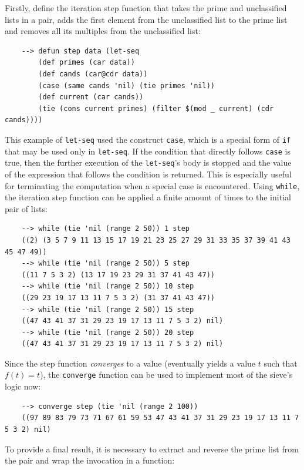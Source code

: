 Firstly, define the iteration step function that takes the prime and unclassified lists in a pair, adds the first element from the unclassified list to the prime list and removes all its multiples from the unclassified list:

\begin{Verbatim}
    --> defun step data (let-seq
        (def primes (car data))
        (def cands (car@cdr data))
        (case (same cands 'nil) (tie primes 'nil))
        (def current (car cands))
        (tie (cons current primes) (filter $(mod _ current) (cdr cands))))
\end{Verbatim}

This example of \verb|let-seq| used the construct \verb|case|, which is a special form of \verb|if| that may be used only in \verb|let-seq|. If the condition that directly follows \verb|case| is true, then the further execution of the \verb|let-seq|'s body is stopped and the value of the expression that follows the condition is returned. This is especially useful for terminating the computation when a special case is encountered. Using \verb|while|, the iteration step function can be applied a finite amount of times to the initial pair of lists:

\begin{Verbatim}
    --> while (tie 'nil (range 2 50)) 1 step
    ((2) (3 5 7 9 11 13 15 17 19 21 23 25 27 29 31 33 35 37 39 41 43 45 47 49))
    --> while (tie 'nil (range 2 50)) 5 step
    ((11 7 5 3 2) (13 17 19 23 29 31 37 41 43 47))
    --> while (tie 'nil (range 2 50)) 10 step
    ((29 23 19 17 13 11 7 5 3 2) (31 37 41 43 47))
    --> while (tie 'nil (range 2 50)) 15 step
    ((47 43 41 37 31 29 23 19 17 13 11 7 5 3 2) nil)
    --> while (tie 'nil (range 2 50)) 20 step
    ((47 43 41 37 31 29 23 19 17 13 11 7 5 3 2) nil)
\end{Verbatim}

Since the step function \textit{converges} to a value (eventually yields a value $t$ such that $f(t) = t$), the \verb|converge| function can be used to implement most of the sieve's logic now:

\begin{Verbatim}
    --> converge step (tie 'nil (range 2 100))
    ((97 89 83 79 73 71 67 61 59 53 47 43 41 37 31 29 23 19 17 13 11 7 5 3 2) nil)
\end{Verbatim}

To provide a final result, it is necessary to extract and reverse the prime list from the pair and wrap the invocation in a function:

